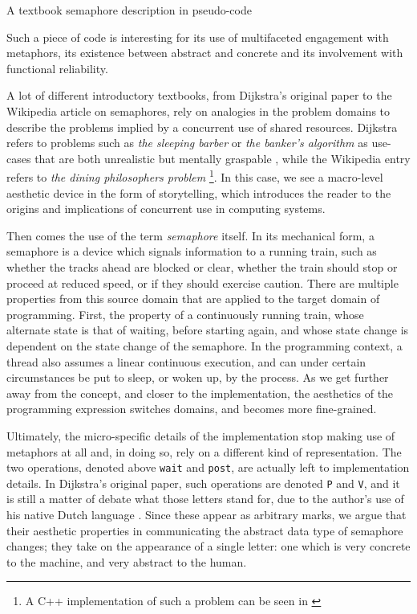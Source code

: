 \begin{listing}
  \inputminted{cpp}{./corpus/semaphore.cpp}
  \caption{A textbook semaphore description in pseudo-code \citep{arpaci_ostep_2018}}
  \label{code:semaphore-pseudocode}
\end{listing}

Such a piece of code is interesting for its use of multifaceted engagement with metaphors, its existence between abstract and concrete and its involvement with functional reliability.

A lot of different introductory textbooks, from Dijkstra's original paper to the Wikipedia article on semaphores, rely on analogies in the problem domains to describe the problems implied by a concurrent use of shared resources. Dijkstra refers to problems such as \emph{the sleeping barber} or \emph{the banker's algorithm} as use-cases that are both unrealistic but mentally graspable \citep{dijkstra_cooperating_1965}, while the Wikipedia entry refers to \emph{the dining philosophers problem} \citep{wikipedia_semaphore_2023}\footnote{A C++ implementation of such a problem can be seen in \citep{arpaci-dusseau_ostepcode_2023}}. In this case, we see a macro-level aesthetic device in the form of storytelling, which introduces the reader to the origins and implications of concurrent use in computing systems.

Then comes the use of the term \emph{semaphore} itself. In its mechanical form, a semaphore is a device which signals information to a running train, such as whether the tracks ahead are blocked or clear, whether the train should stop or proceed at reduced speed, or if they should exercise caution. There are multiple properties from this source domain that are applied to the target domain of programming. First, the property of a continuously running train, whose alternate state is that of waiting, before starting again, and whose state change is dependent on the state change of the semaphore. In the programming context, a thread also assumes a linear continuous execution, and can under certain circumstances be put to sleep, or woken up, by the process. As we get further away from the concept, and closer to the implementation, the aesthetics of the programming expression switches domains, and becomes more fine-grained.

Ultimately, the micro-specific details of the implementation stop making use of metaphors at all and, in doing so, rely on a different kind of representation. The two operations, denoted above \lstinline{wait} and \lstinline{post}, are actually left to implementation details. In Dijkstra's original paper, such operations are denoted \lstinline{P} and \lstinline{V}, and it is still a matter of debate what those letters stand for, due to the author's use of his native Dutch language \citep{wikipedia_semaphore_2023}. Since these appear as arbitrary marks, we argue that their aesthetic properties in communicating the abstract data type of semaphore changes; they take on the appearance of a single letter: one which is very concrete to the machine, and very abstract to the human.

